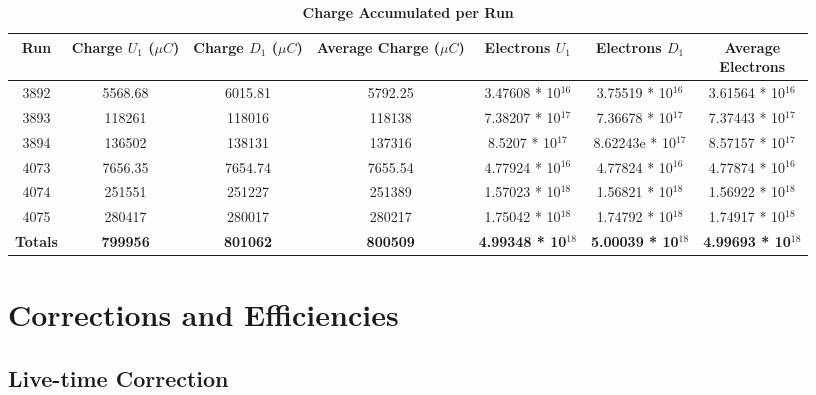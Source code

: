 \begin{table}[!h]
\centering
\begin{tabular}{|c c c c c c c|}
\hline
\textbf{Run} & \makecell{\textbf{Charge}\\ \textbf{$U_1$ ($\mu C$)}} & \makecell{\textbf{Charge}\\ \textbf{$D_1$ ($\mu C$)}} & \makecell{\textbf{Average}\\ \textbf{Charge}\\ ($\mu C$)} & \makecell{\textbf{Electrons} \\ $U_1$} & \makecell{\textbf{Electrons} \\ $D_1$} & \makecell{\textbf{Average} \\ \textbf{Electrons}}\\
\hline
3892 & 5568.68 & 6015.81 & 5792.25 & 3.47608 * 10$^{16}$ & 3.75519 * 10$^{16}$ & 3.61564 * 10$^{16}$ \\
3893 & 118261 & 118016 & 118138 & 7.38207 * 10$^{17}$ & 7.36678 * 10$^{17}$ & 7.37443 * 10$^{17}$ \\
3894 & 136502 & 138131 & 137316 & 8.5207 * 10$^{17}$ & 8.62243e * 10$^{17}$ & 8.57157 * 10$^{17}$ \\
4073 & 7656.35 & 7654.74 & 7655.54 & 4.77924 * 10$^{16}$ & 4.77824 * 10$^{16}$ & 4.77874 * 10$^{16}$ \\
4074 & 251551 & 251227 & 251389 & 1.57023 * 10$^{18}$ & 1.56821 * 10$^{18}$ & 1.56922 * 10$^{18}$ \\
4075 & 280417 & 280017 & 280217 & 1.75042 * 10$^{18}$ & 1.74792 * 10$^{18}$ & 1.74917 * 10$^{18}$ \\
\hline
\textbf{Totals} & \textbf{799956} & \textbf{801062} & \textbf{800509} & \textbf{4.99348 * 10$^{18}$} & \textbf{5.00039 * 10$^{18}$} & \textbf{4.99693 * 10$^{18}$} \\
\hline
\end{tabular}
\caption{\bf{Charge Accumulated per Run}}
\label{tab:charges}
\end{table}

\section{Corrections and Efficiencies}
\label{sec:cor_eff}

\subsection{Live-time Correction}
\label{ssec:live-time}

